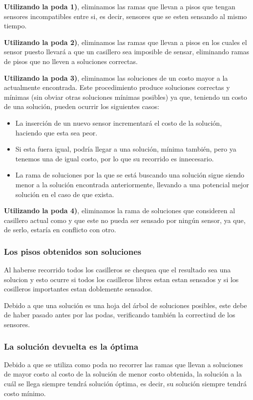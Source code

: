 \documentclass[a4paper, 10pt, twoside]{article}
\begin{document}
\textbf{Utilizando la poda 1)}, eliminamos las ramas que llevan a pisos que tengan sensores incompatibles entre si, es decir, sensores que se esten sensando al mismo tiempo.

\textbf{Utilizando la poda 2)}, eliminamos las ramas que llevan a pisos en los cuales el sensor puesto llevará a que un casillero \Libre sea imposible de sensar, eliminando ramas de pisos que no lleven a soluciones correctas.

\textbf{Utilizando la poda 3)}, eliminamos las soluciones de un costo mayor a la actualmente encontrada. Este procedimiento produce soluciones correctas y mínimas (sin obviar otras soluciones mínimas posibles) ya que, teniendo un costo de una solución, pueden ocurrir los siguientes casos:


\begin{itemize}
\item La inserción de un nuevo sensor incrementará el costo de la solución, haciendo que esta sea peor.
\item Si esta fuera igual, podría llegar a una solución, mínima también, pero ya tenemos una de igual costo, por lo que su recorrido es innecesario.
\item La rama de soluciones por la que se está buscando una solución sigue siendo menor a la solución encontrada anteriormente, llevando a una potencial mejor solución en el caso de que exista.
\end{itemize}

\textbf{Utilizando la poda 4)}, eliminamos la rama de soluciones que consideren al casillero actual como \Libre y que este no pueda ser sensado por ningún sensor, ya que, de serlo, estaría en conflicto con otro.

\subsubsection{Los pisos obtenidos son soluciones}

Al haberse recorrido todos los casilleros se chequea que el resultado sea una solucion y esto ocurre si todos los casilleros libres estan estan sensados y si los cosilleros importantes estan doblemente sensados.

Debido a que una solución es una hoja del árbol de soluciones posibles, este debe de haber pasado antes por las podas, verificando también la correctiud de los sensores.


\subsubsection{La solución devuelta es la óptima}
Debido a que se utiliza como poda no recorrer las ramas que llevan a soluciones de mayor costo al costo de la solución de menor costo obtenida, la solución a la cuál se llega siempre tendrá solución óptima, es decir, su solución siempre tendrá costo mínimo.
\end{document}
